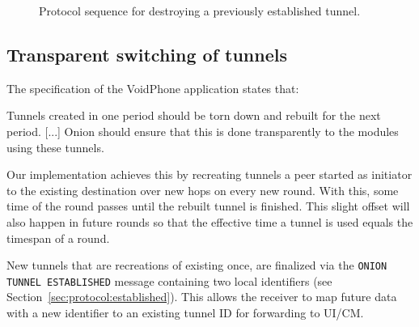 \documentclass[paper=letter, fontsize=12pt]{article}
\begin{document}
\begin{figure}[ht]
    \caption{Protocol sequence for destroying a previously established tunnel.}
    \label{fig:teardown}
\end{figure}

\subsection{Transparent switching of tunnels}
\label{sec:function:switch}
The specification of the VoidPhone application states that:
\begin{displayquote}
Tunnels created in one period should be torn down and rebuilt for the next period. [...]
Onion should ensure that this is done transparently to the modules using these tunnels.
\end{displayquote}

Our implementation achieves this by recreating tunnels a peer started as initiator to the existing destination over new hops on every new round. With this, some time of the round passes until the rebuilt tunnel is finished. This slight offset will also happen in future rounds so that the effective time a tunnel is used equals the timespan of a round.

New tunnels that are recreations of existing once, are finalized via the \texttt{ONION TUNNEL ESTABLISHED} message containing two local identifiers (see Section~\ref{sec:protocol:established}). This allows the receiver to map future data with a new identifier to an existing tunnel ID for forwarding to UI/CM.
\end{document}
